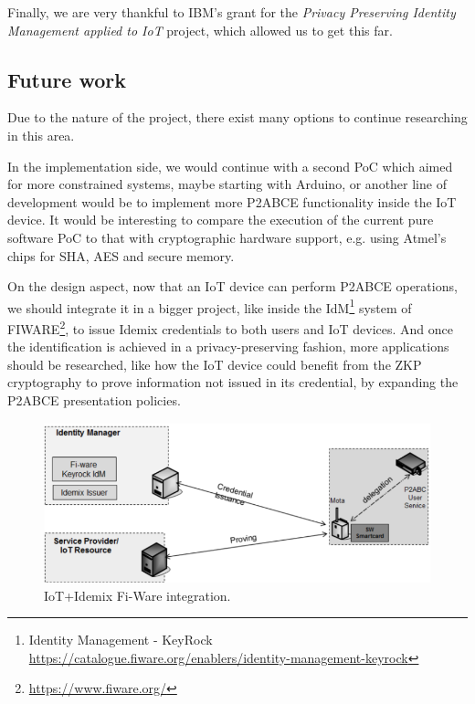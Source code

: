 \documentclass[journal]{IEEEtran}
\begin{document}

Finally, we are very thankful to IBM's grant for the \textit{Privacy Preserving Identity Management applied to IoT} project, which allowed us to get this far. 


\subsection{Future work}


Due to the nature of the project, there exist many options to continue researching in this area.

In the implementation side, we would continue with a second PoC which aimed for more constrained systems, maybe starting with Arduino, or another line of development would be to implement more P2ABCE functionality inside the IoT device. It would be interesting to compare the execution of the current pure software PoC to that with cryptographic hardware support, e.g. using Atmel's chips for SHA, AES and secure memory.

On the design aspect, now that an IoT device can perform P2ABCE operations, we should integrate it in a bigger project, like inside the IdM\footnote{Identity Management - KeyRock \url{https://catalogue.fiware.org/enablers/identity-management-keyrock}} system of FIWARE\footnote{\url{https://www.fiware.org/}}, to issue Idemix credentials to both users and IoT devices. And once the identification is achieved in a privacy-preserving fashion, more applications should be researched, like how the IoT device could benefit from the ZKP cryptography to prove information not issued in its credential, by expanding the P2ABCE presentation policies.

\begin{figure}[bth]
	\begin{center}
		\includegraphics[width=\linewidth]{gfx/fiware}
		\caption{IoT+Idemix Fi-Ware integration.}
	\end{center}
	\label{fig:fiware}
\end{figure}
\end{document}
